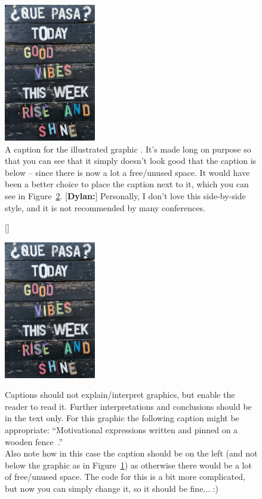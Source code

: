 \begin{figure}[th!]
  \includegraphics[width=4cm]{figures/pexels-ann-h-3095771.jpg}
  \caption{A caption for the illustrated graphic \citep{pictureSource}. It's made long on purpose so that you can see that it simply doesn't look good that the caption is below -- since there is now a lot a free/unused space. It would have been a better choice to place the caption next to it, which you can see in Figure~\ref{fig:graphicCaptionAside}.
  [\textbf{Dylan:}] Personally, I don't love this side-by-side style, and it is not recommended by many conferences.
  \label{fig:graphicCaptionBelow}}
\end{figure}%
%
\begin{figure}[bh!]
  [\FBwidth]
  {\caption{Captions should not explain/interpret graphics, but enable the reader to read it. Further interpretations and conclusions should be in the text only. For this graphic the following caption might be appropriate: ``Motivational expressions written and pinned on a wooden fence~\citep{pictureSource}.''\ \\[1em]
  Also note how in this case the caption should be on the left (and not below the graphic as in Figure~\ref{fig:graphicCaptionBelow}) as otherwise there would be a lot of free/unused space. The code for this is a bit more complicated, but now you can simply change it, so it should be fine... :) \label{fig:graphicCaptionAside}}}
  {\includegraphics[width=4cm]{figures/pexels-ann-h-3095771.jpg}}
\end{figure}
